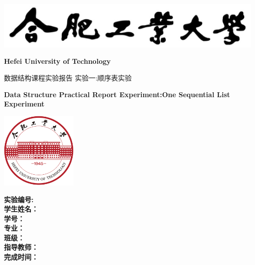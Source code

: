 \begin{titlepage}
\centering
{\vspace{1.7cm} \includegraphics{images/hfut_name.png}\vspace{0.3cm}}

{\LARGE \bfseries Hefei University of Technology}\vspace{1cm}

{\chuhao \heiti 数据结构课程实验报告 实验一:顺序表实验}\vspace{0.7cm}

{\LARGE \bfseries Data Structure Practical Report Experiment:One Sequential List Experiment}\vspace{0.9cm}

{\includegraphics[width=3.76cm, height=3.76cm]{images/hfut_logo.png}\vspace{1.3cm}}

{
\linespread{1.6}
\songti \sanhao
	{\bfseries 实验编号: }\\
	{\bfseries 学生姓名：}\\
	{\bfseries 学\hspace{2em}号：}\\
	{\bfseries 专\hspace{2em}业：}\\
	{\bfseries 班\hspace{2em}级：}\\
	{\bfseries 指导教师：}\\
	{\bfseries 完成时间：}\\
}

\end{titlepage}
